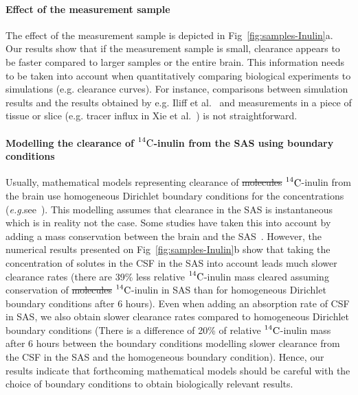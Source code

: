 \documentclass[10pt]{article}
\newcommand{\eg}{\emph{e.g.}\;}
\newcommand{\1}{^{(1)}}
\newcommand{\2}{^{(2)}}
\newcommand{\Cinulin}{$\prescript{14}{}{\text{C}}$-inulin }
\providecommand{\DIFdeltex}[1]{{\protect\color{red}\sout{#1}}}                      %
\providecommand{\DIFaddbegin}{} %
\providecommand{\DIFaddend}{} %
\providecommand{\DIFdelbegin}{} %
\providecommand{\DIFdelend}{} %
\providecommand{\DIFdel}[1]{\texorpdfstring{\DIFdeltex{#1}}{}} %
\newcommand{\DIFscaledelfig}{0.5}
\newlength{\DIFdelgraphicswidth} %
\newlength{\DIFdelgraphicsheight} %
\newcommand{\DIFaddincludegraphics}[2][]{{\color{blue}\fbox{\DIFOincludegraphics[#1]{#2}}}} %
\newcommand{\DIFdelincludegraphics}[2][]{%
\sbox{\DIFdelgraphicsbox}{\DIFOincludegraphics[#1]{#2}}%
\settoboxwidth{\DIFdelgraphicswidth}{\DIFdelgraphicsbox} %
\settoboxtotalheight{\DIFdelgraphicsheight}{\DIFdelgraphicsbox} %
\scalebox{\DIFscaledelfig}{%
\parbox[b]{\DIFdelgraphicswidth}{\usebox{\DIFdelgraphicsbox}\\[-\baselineskip] \rule{\DIFdelgraphicswidth}{0em}}\llap{\resizebox{\DIFdelgraphicswidth}{\DIFdelgraphicsheight}{%
\setlength{\unitlength}{\DIFdelgraphicswidth}%
\begin{picture}(1,1)%
\thicklines\linethickness{2pt} %
{\color[rgb]{1,0,0}\put(0,0){\framebox(1,1){}}}%
{\color[rgb]{1,0,0}\put(0,0){\line( 1,1){1}}}%
{\color[rgb]{1,0,0}\put(0,1){\line(1,-1){1}}}%
\end{picture}%
}\hspace*{3pt}}} %
} %
\DeclareRobustCommand{\DIFaddbegin}{\DIFOaddbegin \let\includegraphics\DIFaddincludegraphics} %
\DeclareRobustCommand{\DIFaddend}{\DIFOaddend \let\includegraphics\DIFOincludegraphics} %
\DeclareRobustCommand{\DIFdelbegin}{\DIFOdelbegin \let\includegraphics\DIFdelincludegraphics} %
\DeclareRobustCommand{\DIFdelend}{\DIFOaddend \let\includegraphics\DIFOincludegraphics} %
\begin{document}
\paragraph{Effect of the measurement sample}
The effect of the measurement sample is depicted in Fig~\ref{fig:samples-Inulin}a. Our results show that if the measurement sample is small, clearance appears to be faster compared to larger samples or the entire brain. This information needs to be taken into account when quantitatively comparing biological experiments to simulations (e.g. clearance curves). For instance, comparisons between simulation results and the results obtained by e.g. Iliff et al.~\cite{Iliff_2012_PVS} and measurements in a piece of tissue or slice (e.g. tracer influx in Xie et al.~\cite{Xie_2013_sleep}) is not straightforward. 

\paragraph{Modelling the clearance of \Cinulin from the SAS using boundary conditions}
Usually, mathematical models representing clearance of \DIFdelbegin \DIFdel{molecules }\DIFdelend \DIFaddbegin \Cinulin \DIFaddend from the brain use homogeneous Dirichlet boundary conditions for the concentrations (\eg see~\cite{Holter9894,stoverud_modeling_2012}). This modelling assumes that clearance in the SAS is instantaneous which is in reality not the case. Some studies have taken this into account by adding a mass conservation between the brain and the SAS~\cite{croci2019uncertainty}.
However, the numerical results presented on Fig~\ref{fig:samples-Inulin}b show that taking the concentration of solutes in the CSF in the SAS into account leads much slower clearance rates (there are 39\% less relative \Cinulin mass cleared assuming conservation of \DIFdelbegin \DIFdel{molecules }\DIFdelend \DIFaddbegin \Cinulin \DIFaddend in SAS than for homogeneous Dirichlet boundary conditions after 6 hours). Even when adding an absorption rate of CSF in SAS, we also obtain slower clearance rates compared to homogeneous Dirichlet boundary conditions (There is a difference of 20\% of relative \Cinulin mass after 6 hours between the boundary conditions modelling slower clearance from the CSF in the SAS and the homogeneous boundary condition). Hence, our results indicate that forthcoming mathematical models should be careful with the choice of boundary conditions to obtain biologically relevant results.
\end{document}
